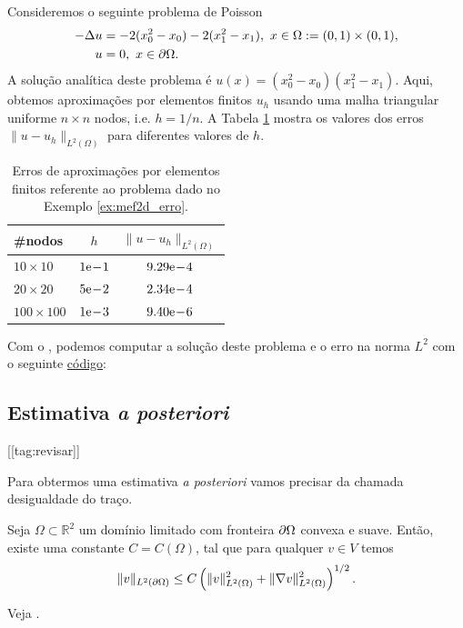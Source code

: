 \begin{ex}\label{ex:mef2d_erro}
  Consideremos o seguinte problema de Poisson
  \begin{align}
    -\Delta u &= -2(x_0^2-x_0)-2(x_1^2-x_1),~x\in\Omega:=(0, 1)\times (0, 1),\\
    u &= 0,~x\in\partial\Omega.
  \end{align}
  A solução analítica deste problema é $u(x) = (x_0^2-x_0)(x_1^2-x_1)$. Aqui, obtemos aproximações por elementos finitos $u_h$ usando uma malha triangular uniforme $n\times n$ nodos, i.e. $h=1/n$. A Tabela \ref{tab:mef2d_erro} mostra os valores dos erros $\|u-u_h\|_{L^2(\Omega)}$ para diferentes valores de $h$.

  \begin{table}[h!]
    \centering
    \caption{Erros de aproximações por elementos finitos referente ao problema dado no Exemplo \ref{ex:mef2d_erro}.}
    \begin{tabular}{lc|c}
      \#nodos & $h$   & $\|u-u_h\|_{L^2(\Omega)}$ \\\hline
      $10\times 10$   & $1\mathrm{e}\!-\!1$  & $9.29\mathrm{e}\!-\!4$\\
      $20\times 20$   & $5\mathrm{e}\!-\!2$  & $2.34\mathrm{e}\!-\!4$\\
      $100\times 100$ & $1\mathrm{e}\!-\!3$ & $9.40\mathrm{e}\!-\!6$ \\\hline 
    \end{tabular}
    \label{tab:mef2d_erro}
  \end{table}

\ifispython
Com o \fenics, podemos computar a solução deste problema e o erro na norma $L^2$ com o seguinte \href{https://github.com/phkonzen/notas/blob/master/src/MetodoElementosFinitos/cap_mef2d/dados/ex_mef2d_erro/ex_mef2d_erro.py}{código}:

\fi
\end{ex}

\subsection{Estimativa {\it a posteriori}}
[[tag:revisar]]


Para obtermos uma estimativa {\it a posteriori} vamos precisar da chamada desigualdade do traço.

\begin{teo}
  Seja $\Omega\subset \mathbb{R}^2$ um domínio limitado com fronteira $\partial\Omega$ convexa e suave. Então, existe uma constante $C = C(\Omega)$, tal que para qualquer $v\in V$ temos
  \begin{equation}
    \|v\|_{L^2(\partial\Omega)} \leq C\left(\|v\|_{L^2(\Omega)}^2 + \|\nabla v\|_{L^2(\Omega)}^2\right)^{1/2}.
  \end{equation}
\end{teo}
\begin{dem}
  Veja \cite{Larson2013a}.
\end{dem}

